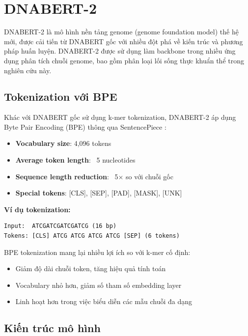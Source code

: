 \section{DNABERT-2}
\label{sec:dnabert2}

DNABERT-2 \cite{zhou2023dnabert} là mô hình nền tảng genome (genome foundation model) thế hệ mới, được cải tiến từ DNABERT gốc với nhiều đột phá về kiến trúc và phương pháp huấn luyện. DNABERT-2 được sử dụng làm backbone trong nhiều ứng dụng phân tích chuỗi genome, bao gồm phân loại lối sống thực khuẩn thể trong nghiên cứu này.

\subsection{Tokenization với BPE}

Khác với DNABERT gốc sử dụng k-mer tokenization, DNABERT-2 áp dụng Byte Pair Encoding (BPE) \cite{sennrich2015neural} thông qua SentencePiece \cite{kudo2018sentencepiece}:

\begin{itemize}
    \item \textbf{Vocabulary size}: 4,096 tokens
    \item \textbf{Average token length}: ~5 nucleotides
    \item \textbf{Sequence length reduction}: ~5× so với chuỗi gốc
    \item \textbf{Special tokens}: [CLS], [SEP], [PAD], [MASK], [UNK]
\end{itemize}

\textbf{Ví dụ tokenization:}
\begin{verbatim}
Input:  ATCGATCGATCGATCG (16 bp)
Tokens: [CLS] ATCG ATCG ATCG ATCG [SEP] (6 tokens)
\end{verbatim}

BPE tokenization mang lại nhiều lợi ích so với k-mer cố định:
\begin{itemize}
    \item Giảm độ dài chuỗi token, tăng hiệu quả tính toán
    \item Vocabulary nhỏ hơn, giảm số tham số embedding layer
    \item Linh hoạt hơn trong việc biểu diễn các mẫu chuỗi đa dạng
\end{itemize}

\subsection{Kiến trúc mô hình}

